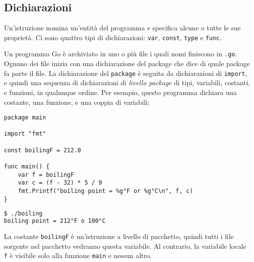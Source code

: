 \documentclass[../../thesis.tex]{subfiles}
\begin{document}
    \subsection{Dichiarazioni}\label{subsec:dichiarazioni}
    Un'istruzione nomina un'entità del programma e specifica alcune o tutte le sue proprietà.
    Ci sono quattro tipi di dichiarazioni: \verb"var", \verb"const", \verb"type" e \verb"func".
    \hfill \vspace{12pt}

    Un programma Go è archiviato in uno o più file i quali nomi finiscono in \verb".go".
    Ognuno dei file inizia con una dichiarazione del package che dice di quale package fa parte il file.
    La dichiarazione del \verb"package" è seguita da dichiarazioni di \verb"import", e quindi una sequenza di dichiarazioni di \textit{livello package} di tipi, variabili, costanti, e funzioni, in qualunque ordine.
    Per esempio, questo programma dichiara una costante, una funzione, e una coppia di variabili:
    \begin{lstlisting}[frame = single, label = {lst:lstlisting1-2.1}]
package main

import "fmt"

const boilingF = 212.0

func main() {
    var f = boilingF
    var c = (f - 32) * 5 / 9
    fmt.Printf("boiling point = %g°F or %g°C\n", f, c)
}
    \end{lstlisting}
    \begin{lstlisting}[language = bash, frame = L, label = {lst:lstlisting1-2.2}]
$ ./boiling
boiling point = 212°F o 100°C
    \end{lstlisting}
    La costante \verb"boilingF" è un'istruzione a livello di pacchetto, quindi tutti i file sorgente nel pacchetto vedranno questa variabile.
    Al contrario, la variabile locale \verb"f" è visibile solo alla funzione \verb"main" e nessun altro.
\end{document}

